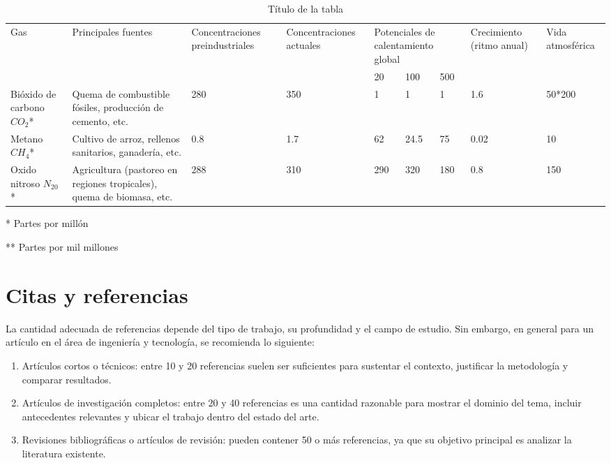 \documentclass[12pt]{difu100cia} %
\begin{document}
\begin{table*}[htb!]
    \centering
    \begin{threeparttable}
    \small
    \caption{Título de la tabla}
    \begin{tabular}{m{3em}m{5em}m{7em}m{7em}m{2em}m{2em}m{2em}m{6em}m{5em}}
        \toprule
         Gas & Principales fuentes & Concentraciones preindustriales & Concentraciones actuales & \multicolumn{3}{m{9em}}{Potenciales de calentamiento global} & Crecimiento (ritmo anual) & Vida atmosférica \\
         & & & & 20 & 100 & 500 & & \\
         \midrule
         Bióxido de carbono $CO_2$* & Quema de combustible fósiles, producción de cemento, etc. & 280 & 350 & 1 & 1 & 1 & 1.6 & 50*200 \\
         Metano $CH_4$* & Cultivo de arroz, rellenos sanitarios, ganadería, etc. & 0.8 & 1.7 & 62 & 24.5 & 75 & 0.02 & 10 \\
         Oxido nitroso $ N_20$* & Agricultura (pastoreo en regiones tropicales),  quema de biomasa, etc. & 288 & 310 & 290 & 320 & 180 & 0.8 & 150 \\
         \bottomrule
    \end{tabular}
    \begin{tablenotes}
        \item [*]	Partes por millón
        \item [**]	Partes por mil millones
    \end{tablenotes}
    \end{threeparttable}
    \label{tab:03}
\end{table*}

\section{Citas y referencias}

La cantidad adecuada de referencias depende del tipo de trabajo, su profundidad y el campo de estudio. Sin embargo, en general para un artículo en el área de ingeniería y tecnología, se recomienda lo siguiente:

\begin{enumerate}
    \item Artículos cortos o técnicos: entre 10 y 20 referencias suelen ser suficientes para sustentar el contexto, justificar la metodología y comparar resultados.
    \item Artículos de investigación completos: entre 20 y 40 referencias es una cantidad razonable para mostrar el dominio del tema, incluir antecedentes relevantes y ubicar el trabajo dentro del estado del arte.
    \item Revisiones bibliográficas o artículos de revisión: pueden contener 50 o más referencias, ya que su objetivo principal es analizar la literatura existente.
\end{enumerate}
\end{document}
